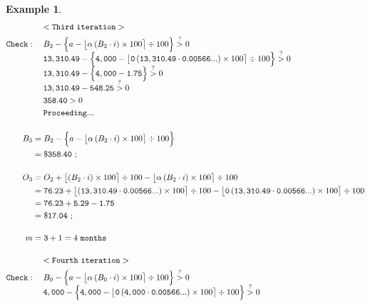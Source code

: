 \documentclass[12pt,letterpaper,oneside]{article}
\newtheorem{example}{Example}[section]
\theoremstyle{remark} %
\begin{document}
\begin{example}
\begin{align*}
	&\quad\;\mathtt{<Third\ iteration>}\\
	\mathtt{Check:}&\quad\;B_{\monthsitc}-\Big\{a-\big\lfloor{\alpha\left(B_{\monthsitc}\cdot i\right)\times 100}\big\rceil\div 100\Big\}\overset{?}{>}0\\[-6pt]
	&\quad\;\mathtt{\balanceitc}-\Big\{\mathtt{\amount}-\big\lfloor{\mathtt{\proportion}\left(\mathtt{\balanceitc}\cdot \mathtt{\rate}\right)\times 100}\big\rceil\div 100\Big\}\overset{?}{>}0\\[-6pt]
	&\quad\;\mathtt{\balanceitc}-\Big\{\mathtt{\amount}-\mathtt{1.75}\Big\}\overset{?}{>}0\\[-6pt]
	&\quad\;\mathtt{\balanceitc}-\mathtt{548.25}\overset{?}{>}0\\
	&\quad\;\mathtt{358.40}>0\\
	&\quad\;\mathtt{Proceeding...}\\[12pt]
	B_{\monthspitc}&=B_{\monthsitc}-\Big\{a-\big\lfloor{\alpha\left(B_{\monthsitc}\cdot i\right)\times 100}\big\rceil\div 100\Big\}\\
	&=\mathtt{\$358.40}\ ;\\[12pt]
	O_{\monthspitc}&=O_{\monthsitc}+\big\lfloor{\left(B_{\monthsitc}\cdot i\right)\times 100}\big\rceil\div 100-\big\lfloor{\alpha\left(B_{\monthsitc}\cdot i\right)\times 100}\big\rceil\div 100\\
	&=\mathtt{\interestitc}+\big\lfloor{\left(\mathtt{\balanceitc}\cdot \mathtt{\rate}\right)\times 100}\big\rceil\div 100-\big\lfloor{\mathtt{\proportion}\left(\mathtt{\balanceitc}\cdot \mathtt{\rate}\right)\times 100}\big\rceil\div 100\\
	&=\mathtt{\interestitc}+\mathtt{5.29}-\mathtt{1.75}\\
	&=\mathtt{\$17.04}\ ;\\[12pt]
	m&=\mathtt{\monthspitc}+1=4\mathtt{\ months}\\[12pt]
	&\quad\;\mathtt{<Fourth\ iteration>}\\
	\mathtt{Check:}&\quad\;B_{\monthsitf}-\Big\{a-\big\lfloor{\alpha\left(B_{\monthsitf}\cdot i\right)\times 100}\big\rceil\div 100\Big\}\overset{?}{>}0\\[-6pt]
	&\quad\;\mathtt{\balanceitf}-\Big\{\mathtt{\amount}-\big\lfloor{\mathtt{\proportion}\left(\mathtt{\balanceitf}\cdot \mathtt{\rate}\right)\times 100}\big\rceil\div 100\Big\}\overset{?}{>}0\\[-6pt]

\end{align*}
\end{example}
\end{document}
